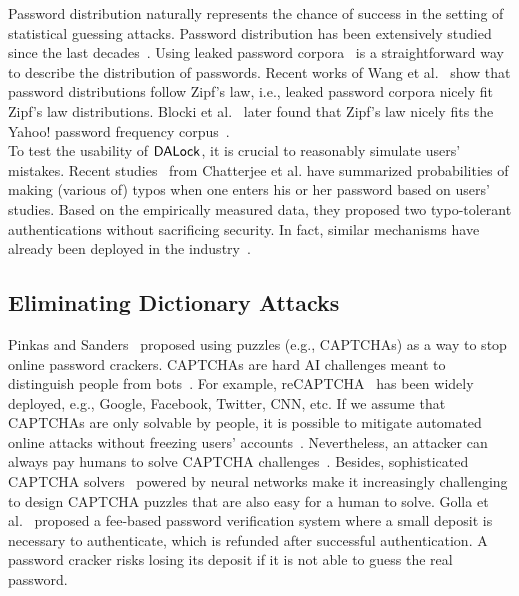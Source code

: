  Password distribution naturally represents the chance of success in the setting of statistical guessing attacks. Password distribution has been extensively studied since the last decades~\cite{FloHer:WWW07,DavKev:WWW12}. Using leaked password corpora~\cite{SP:Bonneau12,Dataset:RockYou,Dataset:LinkedIn} is a straightforward way to describe the distribution of passwords. Recent works of Wang et al.~\cite{EPRINT:WJHW14,TIFS17:WCWPXG,ESORICS:WanWan16} show that password distributions follow Zipf's law, i.e., leaked password corpora nicely fit Zipf's law distributions. Blocki et al.~\cite{SP:BloHarZho18} later found that Zipf's law nicely fits the Yahoo! password frequency corpus~\cite{SP:Bonneau12,NDSS:BloDatBon16}. \\

  To test the usability of $\mathsf{DALock}$, it is crucial to reasonably simulate users' mistakes. Recent studies~\cite{CCS:CWPCR17,SP:CAAJR16} from Chatterjee et al. have summarized probabilities of making (various of) typos when one enters his or her password based on users' studies. Based on the empirically measured data, they proposed two typo-tolerant authentications without sacrificing security. In fact, similar mechanisms have already been deployed in the industry~\cite{News:FacebookCaseSensitiveNews,News:AmazonTypo}. 


\subsection{Eliminating Dictionary Attacks} 


 Pinkas and Sanders~\cite{CCS:PinSan02} proposed using puzzles (e.g., CAPTCHAs) as a way to stop online password crackers. CAPTCHAs are hard AI challenges meant to distinguish people from bots~\cite{EC:vBHL03}. For example, reCAPTCHA~\cite{von2008recaptcha} has been widely deployed, e.g., Google, Facebook, Twitter, CNN, etc. If we assume that CAPTCHAs are only solvable by people, it is possible to mitigate automated online attacks without freezing users' accounts~\cite{SP:BBFNJ10,CCS:BurMarMit11}. Nevertheless, an attacker can always pay humans to solve CAPTCHA challenges~\cite{captchaSolver}. Besides, sophisticated CAPTCHA solvers~\cite{NDSS:GYCZLT16,CCS:YTFZFX18} powered by neural networks make it increasingly challenging to design CAPTCHA puzzles that are also easy for a human to solve.  Golla et al.~\cite{SOUPS:GBD17} proposed a fee-based password verification system where a small deposit is necessary to authenticate, which is refunded after successful authentication. A password cracker risks losing its deposit if it is not able to guess the real password.  



